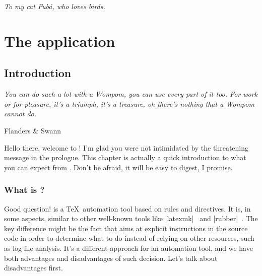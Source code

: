 \documentclass[a4paper,twoside,12pt]{memoir}
\begin{document}
\vspace*{25em}

\begin{flushright}
\em To my cat Fubá, who loves birds.
\end{flushright}

\cleardoublepage

\tableofcontents*

\cleardoublepage

\listoffigures*

\cleardoublepage

\listoftables*

\cleardoublepage

\listofcodes*

\mainmatter

\part{The application}
\label{part:application}

\chapter{Introduction}
\label{chap:introduction}

\epigraph{\emph{You can do such a lot with a Wompom, you can use every part of it too.
For work or for pleasure, it's a triumph, it's a treasure,
oh there's nothing that a Wompom cannot do.}}{Flanders \& Swann}

Hello there, welcome to \arara! I'm glad you were not intimidated by the threatening
message in the prologue. This chapter is actually a quick introduction to what you
can expect from \arara. Don't be afraid, it will be easy to digest, I promise.

\section{What is \texorpdfstring{\arara}{arara}?}
\label{sec:whatisarara}

Good question! \arara is a \TeX\ automation tool based on rules and directives. It is,
in some aspects, similar to other well-known tools like |latexmk|~\cite{collins:2001}
and |rubber|~\cite{rubber:2009}. The key difference might be the fact that \arara
aims at explicit instructions in the source code in order to determine what to do instead
of relying on other resources, such as log file analysis. It's a different approach for an automation tool, and
we have both advantages and disadvantages of such decision. Let's talk about
disadvantages first.
\end{document}

